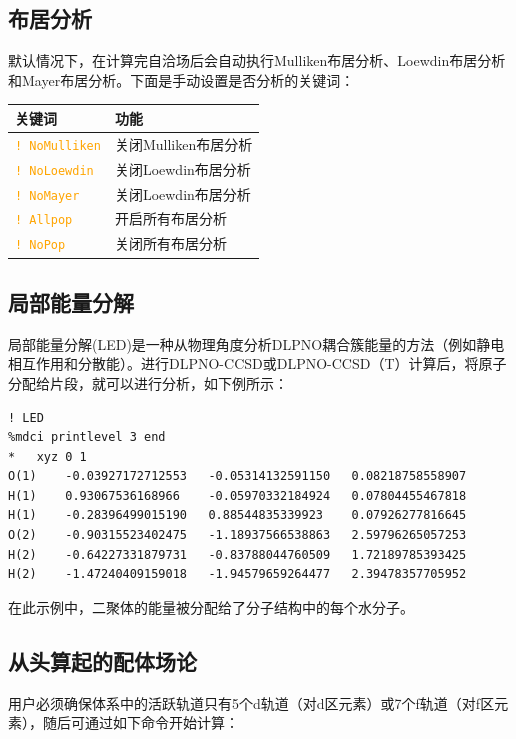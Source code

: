 \documentclass{ctexart}
\newcommand{\cmd}[1]{\textcolor{orange}{ \texttt{#1} }}
\begin{document}
	\subsection{布居分析} 
	
	默认情况下，在计算完自洽场后会自动执行Mulliken布居分析、Loewdin布居分析和Mayer布居分析。下面是手动设置是否分析的关键词：
	
	\begin{table}[H]
		\centering
		\begin{tabular}{ll}
			\toprule
			\textbf{关键词 }           & \textbf{功能}             \\
			\midrule
			 \cmd{! NoMulliken}  & 关闭Mulliken布居分析 \\
			 \cmd{! NoLoewdin}   & 关闭Loewdin布居分析  \\
			 \cmd{! NoMayer}     & 关闭Loewdin布居分析  \\
			 \cmd{! Allpop}      & 开启所有布居分析       \\
			 \cmd{! NoPop}       & 关闭所有布居分析      \\
			 \bottomrule
		\end{tabular}
	\end{table}
	
	\subsection{局部能量分解} 
	
	局部能量分解(LED)是一种从物理角度分析DLPNO耦合簇能量的方法（例如静电相互作用和分散能）。进行DLPNO-CCSD或DLPNO-CCSD（T）计算后，将原子分配给片段，就可以进行分析，如下例所示：
	
	\begin{lstlisting}
! LED
%mdci printlevel 3 end
*	xyz 0 1
O(1)	-0.03927172712553	-0.05314132591150	0.08218758558907
H(1)	0.93067536168966	-0.05970332184924	0.07804455467818
H(1)	-0.28396499015190	0.88544835339923	0.07926277816645
O(2)	-0.90315523402475	-1.18937566538863	2.59796265057253
H(2)	-0.64227331879731	-0.83788044760509	1.72189785393425
H(2)	-1.47240409159018	-1.94579659264477	2.39478357705952
	\end{lstlisting}
	
	在此示例中，二聚体的能量被分配给了分子结构中的每个水分子。
	
	\subsection{从头算起的配体场论} 
	
	用户必须确保体系中的活跃轨道只有5个d轨道（对d区元素）或7个f轨道（对f区元素），随后可通过如下命令开始计算：
	
\end{document}

